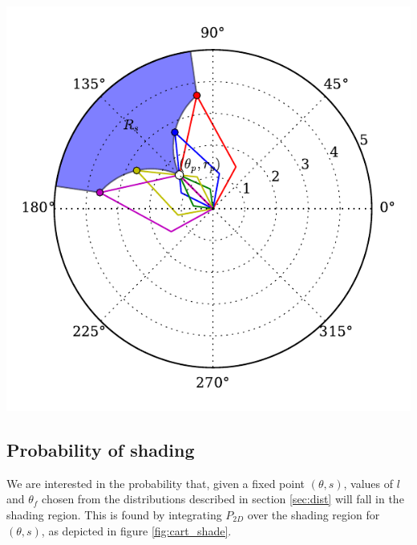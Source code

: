 \documentclass[10pt]{article}
\newenvironment{mcfig}
	{\par\medskip\noindent\minipage{\linewidth}}
	{\endminipage\par\medskip}
\begin{document}
\begin{multicols}{2}
\begin{mcfig}
	\centering
	\includegraphics[width=\linewidth]{shade_area}
	\vspace{-2em}
	\label{fig:shade_area}
\end{mcfig}

\subsection{Probability of shading}
We are interested in the probability that, given a fixed point $(\theta,s)$, values of $l$ and $\theta_f$ chosen from the distributions described in section \ref{sec:dist} will fall in the shading region.
This is found by integrating $P_{2D}$ over the shading region for $(\theta,s)$, as depicted in figure \ref{fig:cart_shade}.


\end{multicols}
\end{document}
